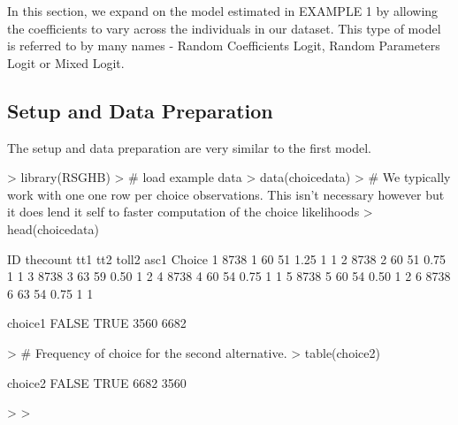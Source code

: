 \documentclass{article}
\begin{document}
In this section, we expand on the model estimated in EXAMPLE 1 by allowing the coefficients to vary across the individuals in our dataset. This type of model is referred to by many names - Random Coefficients Logit, Random Parameters Logit or Mixed Logit. 

\subsection*{Setup and Data Preparation}

The setup and data preparation are very similar to the first model.

\begin{Schunk}
\begin{Sinput}
> library(RSGHB)
> # load example data
> data(choicedata)
> # We typically work with one one row per choice observations. This isn't necessary however but it does lend it self to faster computation of the choice likelihoods
> head(choicedata)
\end{Sinput}
\begin{Soutput}
    ID thecount tt1 tt2 toll2 asc1 Choice
1 8738        1  60  51  1.25    1      1
2 8738        2  60  51  0.75    1      1
3 8738        3  63  59  0.50    1      2
4 8738        4  60  54  0.75    1      1
5 8738        5  60  54  0.50    1      2
6 8738        6  63  54  0.75    1      1
\end{Soutput}
\begin{Soutput}
choice1
FALSE  TRUE 
 3560  6682 
\end{Soutput}
\begin{Sinput}
> # Frequency of choice for the second alternative.
> table(choice2)
\end{Sinput}
\begin{Soutput}
choice2
FALSE  TRUE 
 6682  3560 
\end{Soutput}
\begin{Sinput}
> 
> 
\end{Sinput}
\end{Schunk}
\end{document}
